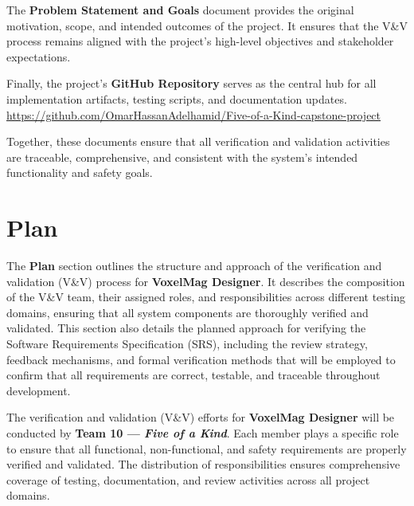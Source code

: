 \documentclass[12pt, titlepage]{article}
\begin{document}
The \textbf{Problem Statement and Goals} document provides the original motivation, scope, and intended outcomes of the project. It ensures that the V\&V process remains aligned with the project’s high-level objectives and stakeholder expectations.

Finally, the project’s \textbf{GitHub Repository} serves as the central hub for all implementation artifacts, testing scripts, and documentation updates.\\
\url{https://github.com/OmarHassanAdelhamid/Five-of-a-Kind-capstone-project}

Together, these documents ensure that all verification and validation activities are traceable, comprehensive, and consistent with the system’s intended functionality and safety goals.
\section{Plan}

The \textbf{Plan} section outlines the structure and approach of the verification and validation (V\&V) process for \textbf{VoxelMag Designer}. It describes the composition of the V\&V team, their assigned roles, and responsibilities across different testing domains, ensuring that all system components are thoroughly verified and validated. This section also details the planned approach for verifying the Software Requirements Specification (SRS), including the review strategy, feedback mechanisms, and formal verification methods that will be employed to confirm that all requirements are correct, testable, and traceable throughout development.

The verification and validation (V\&V) efforts for \textbf{VoxelMag Designer} will be conducted by \textbf{Team 10 --- \textit{Five of a Kind}}. Each member plays a specific role to ensure that all functional, non-functional, and safety requirements are properly verified and validated. The distribution of responsibilities ensures comprehensive coverage of testing, documentation, and review activities across all project domains.
\end{document}
